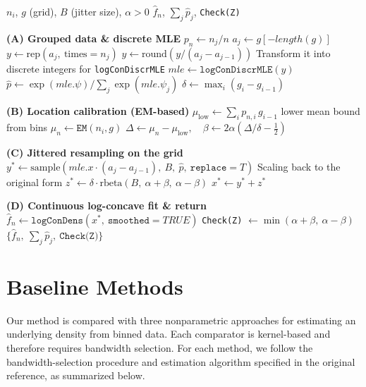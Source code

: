 \documentclass[12pt]{article} %
\begin{document}
\begin{algorithm}[!htb]
\caption{Dens-OLog}
\label{alg:densolog}
\begin{algorithmic}[1]
\Require $n_i$, $g$ (grid), $B$ (jitter size), $\alpha>0$
\Ensure $\widehat f_n$, $\sum_j \widehat{p}_j$, \texttt{Check(Z)}

\Statex \textbf{(A) Grouped data \& discrete MLE}
\State $p_n \gets n_j/n$
\State $a_j \gets g[-length(g)]$
\State $y \gets \text{rep}(a_j,\ \text{times}=n_j)$
\State $y \gets \text{round}(y/(a_j - a_{j-1}))$ \Comment Transform it into discrete integers for \texttt{logConDiscrMLE}
\State $\textit{mle} \gets \texttt{logConDiscrMLE}(y)$
\State $\widehat {p} \gets \exp(\textit{mle}.\psi)\big/\sum_j \exp(\textit{mle}.\psi_j)$
\State $\delta \gets \max_i(g_i-g_{i-1})$

\Statex \textbf{(B) Location calibration (EM-based)}
\State $\mu_{\text{low}} \gets \sum_i p_{n,i}\, g_{i-1}$ \Comment lower mean bound from bins
\State $\mu_n \gets \texttt{EM}(n_i, g)$
\State $\Delta \gets \mu_n - \mu_{\text{low}},\quad \beta \gets 2\alpha\!\left(\Delta/\delta - \tfrac12\right)$

\Statex \textbf{(C) Jittered resampling on the grid}
\State $y^* \gets \text{sample}(\textit{mle}.x \cdot (a_j - a_{j-1}),\ B,\ \widehat p,\ \texttt{replace}{=}T)$ \Comment Scaling back to the original form
\State $z^* \gets \delta \cdot \text{rbeta}(B,\ \alpha{+}\beta,\ \alpha{-}\beta)$
\State $x^* \gets y^* + z^*$

\Statex \textbf{(D) Continuous log-concave fit \& return}
\State $\widehat f_n \gets \texttt{logConDens}(x^*,\ \texttt{smoothed}{=}TRUE)$
\State \quad \texttt{Check(Z)} $\gets \min(\alpha{+}\beta,\ \alpha{-}\beta)$
\State \Return $\{\widehat{f}_n,\ \sum_j \widehat{p}_j,\ \texttt{Check(Z)}\}$

\EndProcedure
\end{algorithmic}
\end{algorithm}

\section{Baseline Methods}\label{appendixF}

Our method is compared with three nonparametric approaches for estimating an underlying density from binned data. Each comparator is kernel-based and therefore requires bandwidth selection. For each method, we follow the bandwidth-selection procedure and estimation algorithm specified in the original reference, as summarized below.
\end{document}
